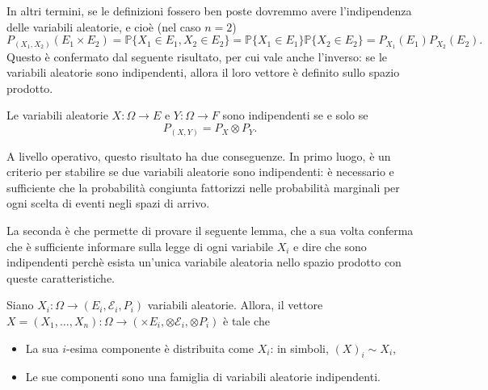 In altri termini, se le definizioni fossero ben poste dovremmo avere l'indipendenza delle variabili aleatorie, e cioè (nel caso $n=2$)
\[
	P_{(X_1,X_2)} (E_1 \times E_2) = \mathbb{P} \{X_1 \in E_1, X_2 \in E_2 \} = \mathbb{P} \{X_1 \in E_1\} \mathbb{P} \{X_2 \in E_2 \} = P_{X_1} (E_1) P_{X_2} (E_2).
\]
Questo è confermato dal seguente risultato, per cui vale anche l'inverso: se le variabili aleatorie sono indipendenti, allora il loro vettore è definito sullo spazio prodotto.
\begin{my_lemma}
	\label{equival_indip}
	Le variabili aleatorie $X:\Omega \to E$ e $Y:\Omega \to F$ sono indipendenti se e solo se 
	\begin{equation}
		\label{crit}
		P_{(X,Y)} = P_X \otimes P_Y.	
	\end{equation}
\end{my_lemma}
A livello operativo, questo risultato ha due conseguenze. In primo luogo, è un criterio per stabilire se due variabili aleatorie sono indipendenti: è necessario e sufficiente che la probabilità congiunta fattorizzi nelle probabilità marginali per ogni scelta di eventi negli spazi di arrivo.

La seconda è che permette di provare il seguente lemma, che a sua volta conferma che è sufficiente informare sulla legge di ogni variabile $X_i$ e dire che sono indipendenti perchè esista un'unica variabile aleatoria nello spazio prodotto con queste caratteristiche.

\begin{my_lemma}
	Siano $X_i : \Omega \to (E_i, \mathcal{E}_i, P_i)$ variabili aleatorie. Allora, il vettore $X=(X_1,\dots,X_n):\Omega \to (\times E_i, \otimes \mathcal{E}_i, \otimes P_i)$ è tale che 
	\begin{itemize}
		\item La sua $i$-esima componente è distribuita come $X_i$: in simboli, $(X)_i \sim X_i$,
		\item Le sue componenti sono una famiglia di variabili aleatorie indipendenti.
	\end{itemize}
\end{my_lemma}

